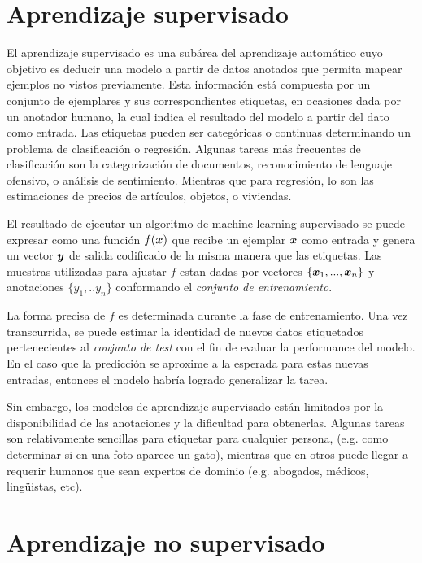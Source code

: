 \section{Aprendizaje supervisado}

El aprendizaje supervisado es una subárea del aprendizaje automático cuyo
objetivo es deducir una modelo a partir de datos anotados que permita mapear
ejemplos no vistos previamente. Esta información está compuesta por un conjunto
de ejemplares y sus correspondientes etiquetas, en ocasiones dada por un
anotador humano, la cual indica el resultado del modelo a partir del dato como
entrada. Las etiquetas pueden ser categóricas o continuas determinando un
problema de clasificación o regresión. Algunas tareas más frecuentes de
clasificación son la categorización de documentos, reconocimiento de lenguaje
ofensivo, o análisis de sentimiento. Mientras que para regresión, lo son las
estimaciones de precios de artículos, objetos, o viviendas.

El resultado de ejecutar un algoritmo de machine learning supervisado se puede
expresar como una función $f(\boldsymbol{x})$ que recibe un ejemplar $\boldsymbol{x}$ como
entrada y genera un vector $\boldsymbol{y}$ de salida codificado de la misma manera
que las etiquetas. Las muestras utilizadas para ajustar $f$ estan dadas por
vectores $\{\boldsymbol{x}_1, ..., \boldsymbol{x}_n\}$ y anotaciones $\{y_1, .. y_n\}$
conformando el \emph{conjunto de entrenamiento}.

La forma precisa de $f$ es determinada durante la fase de entrenamiento. Una vez
transcurrida, se puede estimar la identidad de nuevos datos etiquetados
pertenecientes al \emph{conjunto de test} con el fin de evaluar la performance
del modelo. En el caso que la predicción se aproxime a la esperada para estas
nuevas entradas, entonces el modelo habría logrado generalizar la tarea.

Sin embargo, los modelos de aprendizaje supervisado están limitados por la
disponibilidad de las anotaciones y la dificultad para obtenerlas.
Algunas tareas son relativamente sencillas para etiquetar para cualquier
persona, (e.g. como determinar si en una foto aparece un gato), mientras que en
otros puede llegar a requerir humanos que sean expertos de dominio (e.g.
abogados, médicos, lingüistas, etc).

\section{Aprendizaje no supervisado}


